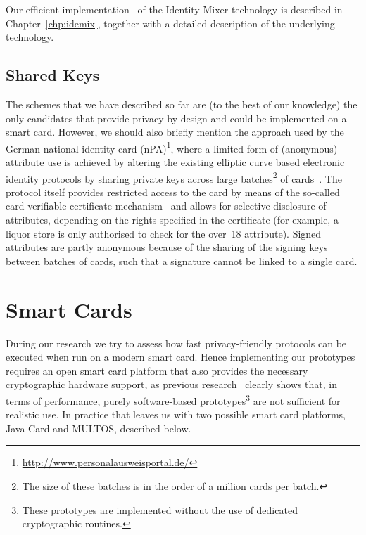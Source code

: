 Our efficient implementation~\cite{VullersAlpar2013} of the Identity Mixer
 technology is described in Chapter~\ref{chp:idemix},
together with a detailed description of the underlying technology.

\subsection{Shared Keys\label{sec:nPA}}

The schemes that we have described so far are (to the best of our knowledge) the
only candidates that provide privacy by design and could be implemented on a
smart card. However, we should also briefly mention the approach used by
the German national identity card (nPA)\footnote{%
\url{http://www.personalausweisportal.de/}}, where a limited form of (anonymous)
 attribute use is achieved by altering the existing
elliptic curve based electronic identity protocols by sharing private keys
 across large batches\footnote{The size of these batches is in the order of a million cards per batch.} of cards~\cite{Kugler2010}. The
protocol itself provides restricted access to the card by means of the so-called
card verifiable certificate mechanism~\cite{EAC20} and allows for selective
disclosure of attributes, depending on the rights specified in the certificate
(for example, a liquor store is only authorised to check
for the \textsf{over~18} attribute). Signed attributes are partly anonymous
 because of the sharing of the signing keys between
batches of cards, such that a signature cannot be linked to a single card.

\section{Smart Cards\label{sec:smartcards}}

During our research we try to assess how fast privacy-friendly protocols can be
executed when run on a modern smart card. Hence
implementing our prototypes requires an open smart card platform that also provides the necessary cryptographic hardware support,
as previous research~\cite{TewsJacobs09} clearly shows that, in terms of
performance, purely software-based prototypes\footnote{These prototypes are 
implemented without the use of dedicated cryptographic routines.} are not 
sufficient for realistic use. In practice that leaves us with two possible 
smart card platforms, Java Card and MULTOS, 
described below.

